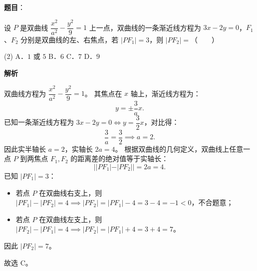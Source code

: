 \begin{answer}

\textbf{题目}：

设 $P$ 是双曲线 $\dfrac{x^2}{a^2} - \dfrac{y^2}{9} = 1$ 上一点，双曲线的一条渐近线方程为 $3x - 2y = 0$，$F_1$、$F_2$ 分别是双曲线的左、右焦点，若 $|PF_1| = 3$，则 $|PF_2| =$\mbox{（　　）}

\begin{gkopts}(2)
\task A．$1$ 或 $5$
\task B．$6$
\task C．$7$
\task D．$9$
\end{gkopts}

\textbf{解析}

双曲线方程为 $\dfrac{x^2}{a^2} - \dfrac{y^2}{9} = 1$。
其焦点在 $x$ 轴上，渐近线方程为：
\nopagebreak[4]
\[
y = \pm \dfrac{3}{a}x.
\]
已知一条渐近线方程为 $3x - 2y = 0 \iff y = \dfrac{3}{2}x$，对比得：
\nopagebreak[4]
\[
\dfrac{3}{a} = \dfrac{3}{2} \implies a = 2.
\]
因此实半轴长 $a = 2$，实轴长 $2a = 4$。
根据双曲线的几何定义，双曲线上任意一点 $P$ 到两焦点 $F_1, F_2$ 的距离差的绝对值等于实轴长：
\nopagebreak[4]
\[
||PF_1| - |PF_2|| = 2a = 4.
\]
已知 $|PF_1| = 3$：
\begin{itemize}
\item 若点 $P$ 在双曲线右支上，则 $|PF_1| - |PF_2| = 4 \implies |PF_2| = |PF_1| - 4 = 3 - 4 = -1 < 0$，不合题意；
\item 若点 $P$ 在双曲线左支上，则 $|PF_2| - |PF_1| = 4 \implies |PF_2| = |PF_1| + 4 = 3 + 4 = 7$。
\end{itemize}

因此 $|PF_2| = 7$。

故选 C。


\end{answer}

